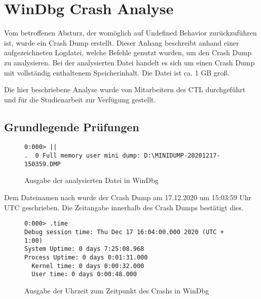 
\section{WinDbg Crash Analyse}
\label{sec:windbg}
Vom betroffenen Absturz, der womöglich auf Undefined Behavior zurückzuführen ist, wurde ein Crash Dump erstellt.
Dieser Anhang beschreibt anhand einer aufgezeichneten Logdatei, welche Befehle genutzt wurden, um den Crash Dump zu analysieren.
Bei der analysierten Datei handelt es sich um einen Crash Dump mit vollständig enthaltenem Speicherinhalt. Die Datei ist ca. 1 GB groß.

Die hier beschriebene Analyse wurde von Mitarbeitern des CTL durchgeführt und für die Studienarbeit zur Verfügung gestellt.

\subsection{Grundlegende Prüfungen}
\begin{figure}[H]
\begin{lstlisting}
0:000> ||
.  0 Full memory user mini dump: D:\MINIDUMP-20201217-150359.DMP
\end{lstlisting}
\caption{Ausgabe der analysierten Datei in WinDbg}
\end{figure}

Dem Dateinamen nach wurde der Crash Dump am 17.12.2020 um 15:03:59 Uhr UTC geschrieben. Die Zeitangabe innerhalb des Crash Dumps bestätigt dies.

\begin{figure}[H]
\begin{lstlisting}
0:000> .time
Debug session time: Thu Dec 17 16:04:00.000 2020 (UTC + 1:00)
System Uptime: 0 days 7:25:08.968
Process Uptime: 0 days 0:01:31.000
  Kernel time: 0 days 0:00:32.000
  User time: 0 days 0:00:48.000
\end{lstlisting}
\caption{Ausgabe der Uhrzeit zum Zeitpunkt des Crashs in WinDbg}
\end{figure}

